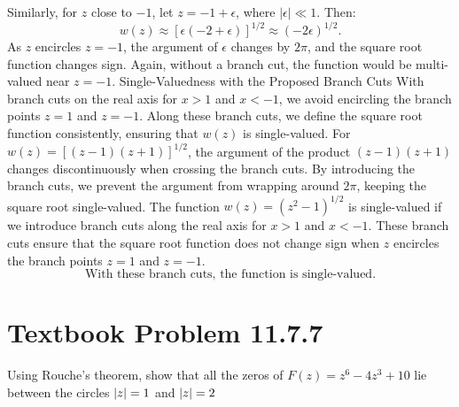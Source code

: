 \documentclass[12pt]{article}
\begin{document}
        Similarly, for \(z\) close to \(-1\), let \(z = -1 + \epsilon\), where \(|\epsilon| \ll 1\). Then:
        \[
        w(z) \approx \left[\epsilon(-2 + \epsilon)\right]^{1/2} \approx (-2\epsilon)^{1/2}.
        \]
        As \(z\) encircles \(z = -1\), the argument of \(\epsilon\) changes by \(2\pi\), and the square root function changes sign. Again, without a branch cut, the function would be multi-valued near \(z = -1\).
        Single-Valuedness with the Proposed Branch Cuts
        With branch cuts on the real axis for \(x > 1\) and \(x < -1\), we avoid encircling the branch points \(z = 1\) and \(z = -1\). Along these branch cuts, we define the square root function consistently, ensuring that \(w(z)\) is single-valued.
        For \(w(z) = \left[(z - 1)(z + 1)\right]^{1/2}\), the argument of the product \((z - 1)(z + 1)\) changes discontinuously when crossing the branch cuts. By introducing the branch cuts, we prevent the argument from wrapping around \(2\pi\), keeping the square root single-valued.
        The function \(w(z) = (z^2 - 1)^{1/2}\) is single-valued if we introduce branch cuts along the real axis for \(x > 1\) and \(x < -1\). These branch cuts ensure that the square root function does not change sign when \(z\) encircles the branch points \(z = 1\) and \(z = -1\).
        \[
        \boxed{\text{With these branch cuts, the function is single-valued.}}
        \]

\section*{Textbook Problem 11.7.7}
    Using Rouche's theorem, show that all the zeros of $F(z) = z^6 - 4 z^3 + 10$ lie between the circles $\abs{z} = 1$ and $\abs{z} = 2$
\end{document}
